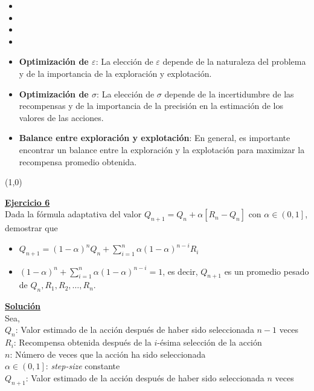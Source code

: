 \documentclass[12pt]{article}
\newlength\tindent
\renewcommand{\indent}{\hspace*{\tindent}}
\begin{document}
\begin{itemize}
\begin{itemize}
        \item

        \item
        \item
        \item
        \item \textbf{Optimización de $\varepsilon$}: La elección de $\varepsilon$ depende de la naturaleza del problema y de la importancia de la exploración y explotación.
        \item \textbf{Optimización de $\sigma$}: La elección de $\sigma$ depende de la incertidumbre de las recompensas y de la importancia de la precisión en la estimación de los valores de las acciones.
        \item \textbf{Balance entre exploración y explotación}: En general, es importante encontrar un balance entre la exploración y la explotación para maximizar la recompensa promedio obtenida.
    \end{itemize}

    \line(1,0){\textwidth}

    \indent\underline{\textbf{Ejercicio 6}}\\
    Dada la fórmula adaptativa del valor $Q_{n+1}= Q_n+\alpha\left[R_{n}-Q_{n}\right]$ con $\alpha\in\left(0,1\right]$, demostrar que

    \begin{itemize}
        \item $Q_{n+1}=(1-\alpha)^{n}Q_{n} + \sum_{i=1}^n \alpha(1-\alpha)^{n-i}R_{i}$
        \item $(1-\alpha)^{n}+\sum_{i=1}^{n} \alpha(1-\alpha)^{n-i}=1$, es decir, $Q_{n+1}$ es un promedio pesado de $Q_{n},R_1,R_2,\dots,R_n$.
    \end{itemize}

    \indent\underline{\textbf{Solución}}\\

    Sea,\\
    $Q_{n}$: Valor estimado de la acción después de haber sido seleccionada $n-1$ veces \\
    $R_i$: Recompensa obtenida después de la $i$-ésima selección de la acción \\
    $n$: Número de veces que la acción ha sido seleccionada \\
    $\alpha\in\left(0,1\right]$: \textit{step-size} constante \\
    $Q_{n+1}$: Valor estimado de la acción después de haber sido seleccionada $n$ veces \\


\end{itemize}
\end{document}
